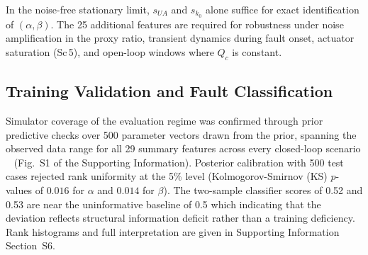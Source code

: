 \documentclass[aps,pre,twocolumn,superscriptaddress]{revtex4-2}
\begin{document}
In the noise-free stationary limit, $s_{U\!A}$ and $s_{k_0}$ alone suffice for exact identification of $(\alpha,\beta)$. The 25 additional features are required for robustness under noise amplification in the proxy ratio, transient dynamics during fault onset, actuator saturation (Sc\,5), and open-loop windows where $Q_c$ is constant. 


\subsection{Training Validation and Fault Classification}
\label{sec:snapshot_classification}
Simulator coverage of the evaluation regime was confirmed through prior predictive checks over 500 parameter vectors drawn from the prior, spanning the observed data range for all 29 summary features across every closed-loop scenario ~\citep{Cranmer2020} (Fig.~S1 of the Supporting
Information). Posterior calibration with 500 test cases rejected rank uniformity at the 5\% level (Kolmogorov-Smirnov (KS) $p$-values of $0.016$ for $\alpha$ and $0.014$ for $\beta$). The two-sample classifier scores of 0.52 and 0.53 are near the uninformative baseline of 0.5 which indicating that the deviation reflects structural information deficit rather than a training deficiency. Rank histograms and
full interpretation are given in Supporting Information Section~S6.
\end{document}
